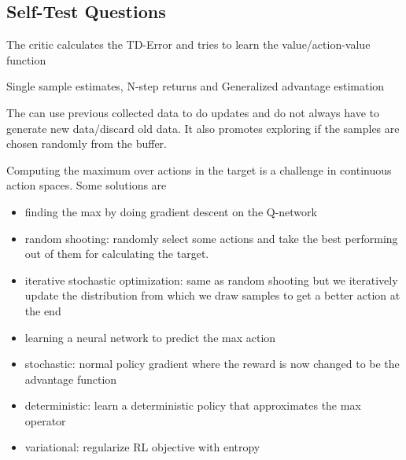 \subsection{Self-Test Questions}
\begin{enumerate}
\newline
The critic calculates the TD-Error and tries to learn the value/action-value function

\newline
Single sample estimates, N-step returns and Generalized advantage estimation

\newline
The can use previous collected data to do updates and do not always have to generate new data/discard old data. It also promotes exploring if the samples are chosen randomly from the buffer.

\newline
Computing the maximum over actions in the target is a challenge in continuous action spaces. Some solutions are \begin{itemize}
    \item finding the max by doing gradient descent on the Q-network
    \item random shooting: randomly select some actions and take the best performing out of them for calculating the target.
    \item iterative stochastic optimization: same as random shooting but we iteratively update the distribution from which we draw samples to get a better action at the end
    \item learning a neural network to predict the max action
\end{itemize}

\begin{itemize}
    \item stochastic: normal policy gradient where the reward is now changed to be the advantage function
    \item deterministic: learn a deterministic policy that approximates the max operator
    \item variational: regularize RL objective with entropy 
\end{itemize}


\end{enumerate}
